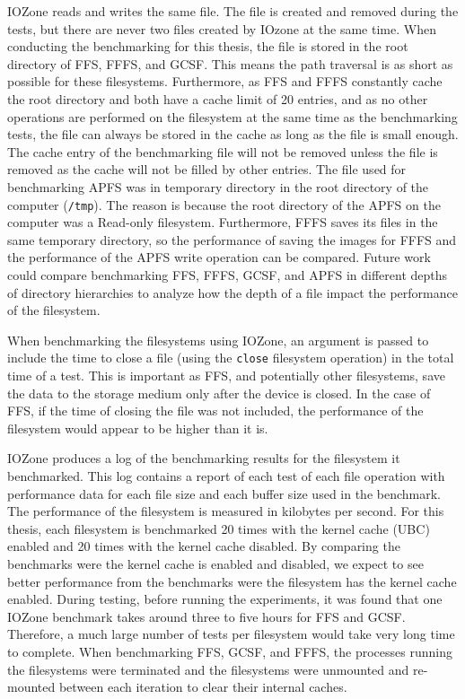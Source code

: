 IOZone reads and writes the same file. The file is created and removed during the tests, but there are never two files created by IOzone at the same time. When conducting the benchmarking for this thesis, the file is stored in the root directory of \gls{FFS}, \gls{FFFS}, and \gls{GCSF}. This means the path traversal is as short as possible for these filesystems. Furthermore, as \gls{FFS} and \gls{FFFS} constantly cache the root directory and both have a cache limit of 20 entries, and as no other operations are performed on the filesystem at the same time as the benchmarking tests, the file can always be stored in the cache as long as the file is small enough. The cache entry of the benchmarking file will not be removed unless the file is removed as the cache will not be filled by other entries. The file used for benchmarking \gls{APFS} was in temporary directory in the root directory of the computer (\texttt{/tmp}). The reason is because the root directory of the \gls{APFS} on the computer was a \mbox{Read-only} filesystem. Furthermore, \gls{FFFS} saves its files in the same temporary directory, so the performance of saving the images for \gls{FFFS} and the performance of the \gls{APFS} write operation can be compared. Future work could compare benchmarking \gls{FFS}, \gls{FFFS}, \gls{GCSF}, and \gls{APFS} in different depths of directory hierarchies to analyze how the depth of a file impact the performance of the filesystem.

When benchmarking the filesystems using IOZone, an argument is passed to include the time to close a file (using the \texttt{close} filesystem operation) in the total time of a test. This is important as \gls{FFS}, and potentially other filesystems, save the data to the storage medium only after the device is closed. In the case of \gls{FFS}, if the time of closing the file was not included, the performance of the filesystem would appear to be higher than it is.

IOZone produces a log of the benchmarking results for the filesystem it benchmarked. This log contains a report of each test of each file operation with performance data for each file size and each buffer size used in the benchmark. The performance of the filesystem is measured in kilobytes per second. For this thesis, each filesystem is benchmarked 20 times with the kernel cache (\gls{UBC}) enabled and 20 times with the kernel cache disabled. By comparing the benchmarks were the kernel cache is enabled and disabled, we expect to see better performance from the benchmarks were the filesystem has the kernel cache enabled. During testing, before running the experiments, it was found that one IOZone benchmark takes around three to five hours for \gls{FFS} and \gls{GCSF}. Therefore, a much large number of tests per filesystem would take very long time to complete. When benchmarking \gls{FFS}, \gls{GCSF}, and \gls{FFFS}, the processes running the filesystems were terminated and the filesystems were unmounted and \mbox{re-mounted} between each iteration to clear their internal caches.

